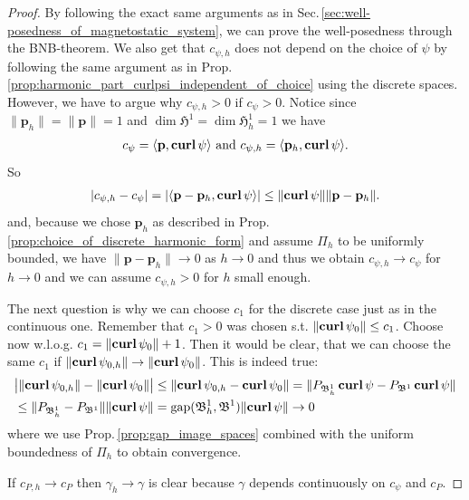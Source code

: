 \documentclass[../master_thesis.tex]{subfiles}
\begin{document}
\begin{proof}
    By following the exact same arguments as in Sec.\,\ref{sec:well-posedness_of_magnetostatic_system}, 
    we can prove
    the well-posedness through the BNB-theorem. We also get that
    $c_{\psi,h}$ does not depend on the choice of $\psi$ by following the same 
    argument as in Prop.\,\ref{prop:harmonic_part_curlpsi_independent_of_choice} 
    using the discrete spaces.
    However, we have to argue
    why $c_{\psi,h}>0$ if $c_\psi>0$. 
    Notice since $ \lVert \mathbf{p}_h \rVert  = \lVert \mathbf{p} \rVert =1$
    and $\dim \mathfrak{H}^1 = \dim \mathfrak{H}^1_h = 1$
    we have 
    \begin{align*}
        c_\psi = \langle \mathbf{p}, \veccurl \psi \rangle 
        \text{ and } c_{\psi,h} = \langle \mathbf{p}_h, \veccurl \psi \rangle.
    \end{align*}
    So 
    \begin{align*}
        | c_{\psi,h} - c_\psi | = |\langle \mathbf{p} - \mathbf{p}_h, \veccurl \psi \rangle|
        \leq \lVert \veccurl \psi \rVert \lVert \mathbf{p} - \mathbf{p}_h \rVert.
    \end{align*}
    and, because we chose $\mathbf{p}_h$ as described in Prop.\,\ref{prop:choice_of_discrete_harmonic_form} 
    and assume $\Pi_h$ to be 
    uniformly bounded, we have $\lVert \mathbf{p} - \mathbf{p}_h \rVert \rightarrow 0$
    as $h\rightarrow 0$ and thus
    we obtain $c_{\psi,h} \rightarrow c_\psi$ for $h \rightarrow 0$ and 
    we can assume $c_{\psi,h} > 0$ for $h$ small enough.

    The next question is why we can choose $c_1$ for the discrete case just as 
    in the continuous one. Remember that $c_1>0$ was chosen 
    s.t. $\lVert \veccurl \psi_0 \rVert \leq c_1$. Choose now w.l.o.g. 
    $c_1 =  \lVert \veccurl \psi_0 \rVert + 1$. Then it would be clear, 
    that we can choose the same $c_1$ if $\lVert \veccurl \psi_{0,h} \rVert \rightarrow 
    \lVert \veccurl \psi_0 \rVert$. This is indeed true: 
    \begin{align*}
        &\big| \lVert \veccurl \psi_{0,h} \rVert - \lVert \veccurl \psi_0 \rVert \big|
        \leq \lVert \veccurl \psi_{0,h} -  \veccurl \psi_0 \rVert
        = \lVert P_{\mathfrak{B}^1_h}\veccurl \psi -  P_{\mathfrak{B}^1} \veccurl \psi \rVert
        \\ &\leq \lVert P_{\mathfrak{B}^1_h} -  P_{\mathfrak{B}^1} \rVert
            \lVert \veccurl \psi \rVert
        = \gap (\mathfrak{B}^1_h, \mathfrak{B}^1) \lVert \veccurl \psi \rVert
        \rightarrow 0
    \end{align*}
    where we use Prop.\,\ref{prop:gap_image_spaces} combined with the uniform boundedness 
    of $\Pi_h$ to obtain convergence.

    If $c_{P,h} \rightarrow c_P$ then $\gamma_h \rightarrow \gamma$ is clear because 
    $\gamma$ depends continuously on $c_{\psi}$ and $c_P$.
\end{proof}
\end{document}
